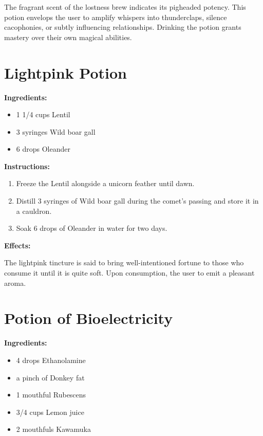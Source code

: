 \documentclass{article}
\begin{document}
The fragrant scent of the lostness brew indicates its pigheaded potency. This potion envelops the user to amplify whispers into thunderclaps, silence cacophonies, or subtly influencing relationships. Drinking the potion grants mastery over their own magical abilities.

\newpage
\section*{Lightpink Potion}

\textbf{Ingredients:}

\begin{itemize}
  \item 1 1/4 cups Lentil
  \item 3 syringes Wild boar gall
  \item 6 drops Oleander
\end{itemize}

\textbf{Instructions:}

\begin{enumerate}
  \item Freeze the Lentil alongside a unicorn feather until dawn.
  \item Distill 3 syringes of Wild boar gall during the comet’s passing and store it in a cauldron.
  \item Soak 6 drops of Oleander in water for two days.
\end{enumerate}

\textbf{Effects:}

The lightpink tincture is said to bring well-intentioned fortune to those who consume it until it is quite soft. Upon consumption, the user to emit a pleasant aroma.

\newpage
\section*{Potion of Bioelectricity}

\textbf{Ingredients:}

\begin{itemize}
  \item 4 drops Ethanolamine
  \item a pinch of Donkey fat
  \item 1 mouthful Rubescens
  \item 3/4 cups Lemon juice
  \item 2 mouthfuls Kawamuka
\end{itemize}
\end{document}
